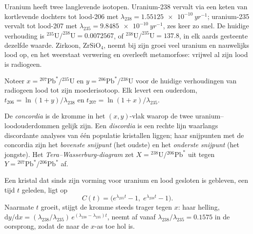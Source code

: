 Uranium heeft twee langlevende isotopen. Uranium-238 vervalt via een keten van
kortlevende dochters tot lood-206 met $\lambda_{238} =
\qty{1.55125e-10}{yr^{-1}}$; uranium-235 vervalt tot lood-207 met $\lambda_{235}
= \qty{9.8485e-10}{yr^{-1}}$, zes keer zo snel. De huidige verhouding is
$^{235}\mathrm{U}/^{238}\mathrm{U} = 0.0072567$, of $^{238}\mathrm{U}/^{235}\mathrm{U}
= 137.8$, in elk aards gesteente dezelfde waarde. Zirkoon, $\mathrm{ZrSiO_4}$, neemt
bij zijn groei veel uranium en nauwelijks lood op, en het weerstaat verwering
en overleeft metamorfose: vrijwel al zijn lood is radiogeen.

Noteer $x = {}^{207}\mathrm{Pb}^*/{}^{235}\mathrm{U}$ en $y =
{}^{206}\mathrm{Pb}^*/{}^{238}\mathrm{U}$ voor de huidige verhoudingen van radiogeen lood
tot zijn moederisotoop. Elk levert een ouderdom, $t_{206} = \ln(1 + y)/\lambda_{238}$
en $t_{207} = \ln(1 + x)/\lambda_{235}$.

\begin{definition}
\label{def:b3:advanced-geochronology:concordia}
De \emph{concordia} is de kromme in het $(x, y)$-vlak waarop
de twee uranium--loodouderdommen gelijk zijn. Een \emph{discordia}
is een rechte lijn waarlangs discordante analyses van één populatie
kristallen liggen; haar snijpunten met de concordia zijn het
\emph{bovenste snijpunt} (het oudste) en het
\emph{onderste snijpunt} (het jongste). Het
\emph{Tera--Wasserburg-diagram} zet
$X = {}^{238}\mathrm{U}/{}^{206}\mathrm{Pb}^*$ uit tegen $Y =
{}^{207}\mathrm{Pb}^*/{}^{206}\mathrm{Pb}^*$ af.
\end{definition}

\begin{theorem}[De concordia]\label{thm:b3:advanced-geochronology:concordia}
Een kristal dat sinds zijn vorming voor uranium en lood gesloten is gebleven, een tijd
$t$ geleden, ligt op
\[
C(t) = \bigl(e^{\lambda_{235}t} - 1,\; e^{\lambda_{238}t} - 1\bigr).
\]
Naarmate $t$ groeit, stijgt de kromme steeds trager tegen $x$: haar helling,
$\mathrm dy/\mathrm dx = (\lambda_{238}/\lambda_{235})\,e^{(\lambda_{238} -
\lambda_{235})t}$, neemt af vanaf $\lambda_{238}/\lambda_{235} = 0.1575$ in de
oorsprong, zodat de  naar de $x$-as toe hol is.
\end{theorem}

